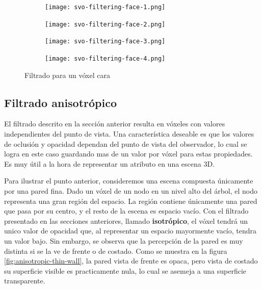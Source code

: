 \begin{figure}
    \begin{center}
        \begin{subfigure}{.24\textwidth}
            \texttt{[image: svo-filtering-face-1.png]}
        \end{subfigure}
        \begin{subfigure}{.24\textwidth}
            \texttt{[image: svo-filtering-face-2.png]}
        \end{subfigure}
        \begin{subfigure}{.24\textwidth}
            \texttt{[image: svo-filtering-face-3.png]}
        \end{subfigure}
        \begin{subfigure}{.24\textwidth}
            \texttt{[image: svo-filtering-face-4.png]}
        \end{subfigure}
    \end{center}
    \caption{Filtrado para un vóxel cara}
    \label{fig:svo_filtering_faces}
\end{figure}


\subsection{Filtrado anisotrópico}

El filtrado descrito en la sección anterior resulta en vóxeles con valores independientes del punto de vista.
Una característica deseable es que los valores de oclusión y opacidad dependan del punto de vista del observador, lo cual se logra en este caso guardando mas de un valor por vóxel para estas propiedades.
Es muy útil a la hora de representar un atributo en una escena 3D.

Para ilustrar el punto anterior, consideremos una escena compuesta únicamente por una pared fina.
Dado un vóxel de un nodo en un nivel alto del árbol, el nodo representa una gran región del espacio.
La región contiene únicamente una pared que pasa por su centro, y el resto de la escena es espacio vacío.
Con el filtrado presentado en las secciones anteriores, llamado \textbf{isotrópico}, el vóxel tendrá un unico valor de opacidad que, al representar un espacio mayormente vacío, tendra un valor bajo.
Sin embargo, se observa que la percepción de la pared es muy distinta si se la ve de frente o de costado.
Como se muestra en la figura \ref{fig:anisotropic-thin-wall}, la pared vista de frente es opaca, pero vista de costado su superficie visible es practicamente nula, lo cual se asemeja a una superficie transparente.

